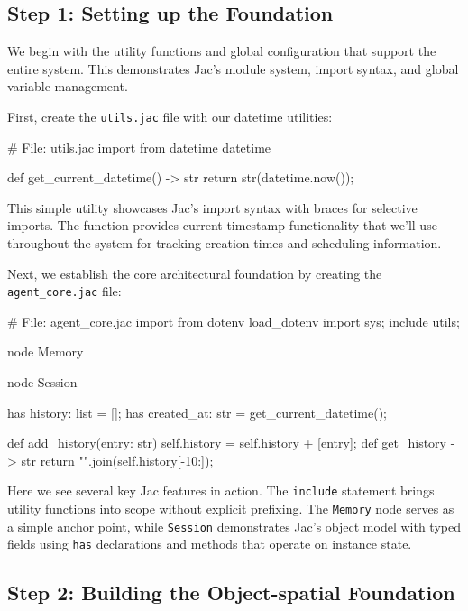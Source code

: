 \subsection{Step 1: Setting up the Foundation}

We begin with the utility functions and global configuration that support the entire system. This demonstrates Jac's module system, import syntax, and global variable management.

First, create the \texttt{utils.jac} file with our datetime utilities:

\begin{jacblock}
# File: utils.jac
import from datetime { datetime }

def get_current_datetime() -> str {
    return str(datetime.now());
}
\end{jacblock}

This simple utility showcases Jac's import syntax with braces for selective imports. The function provides current timestamp functionality that we'll use throughout the system for tracking creation times and scheduling information.

Next, we establish the core architectural foundation by creating the \texttt{agent\_core.jac} file:

\begin{jacblock}
# File: agent_core.jac
import from dotenv { load_dotenv }
import sys;
include utils;

node Memory {}

node Session {
    has history: list = [];
    has created_at: str = get_current_datetime();

    def add_history(entry: str) {
        self.history = self.history + [entry];
    }
    def get_history -> str {
        return "\n".join(self.history[-10:]);
    }
}
\end{jacblock}

Here we see several key Jac features in action. The \texttt{include} statement brings utility functions into scope without explicit prefixing. The \texttt{Memory} node serves as a simple anchor point, while \texttt{Session} demonstrates Jac's object model with typed fields using \texttt{has} declarations and methods that operate on instance state.

\subsection{Step 2: Building the Object-spatial Foundation}

